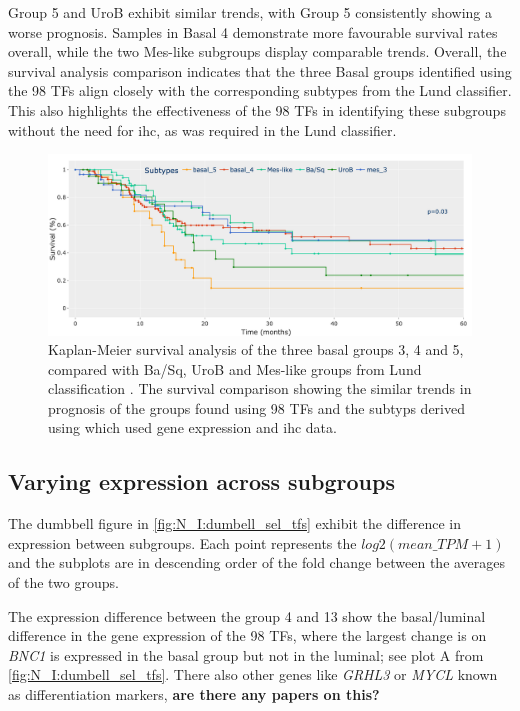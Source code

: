 Group 5 and UroB exhibit similar trends, with Group 5 consistently showing a worse prognosis. Samples in Basal 4 demonstrate more favourable survival rates overall, while the two Mes-like subgroups display comparable trends. Overall, the survival analysis comparison indicates that the three Basal groups identified using the 98 TFs align closely with the corresponding subtypes from the Lund classifier. This also highlights the effectiveness of the 98 TFs in identifying these subgroups without the need for \acrlong{ihc}, as was required in the Lund classifier.


\begin{figure}[!htb]
    \centering
    \includegraphics[width=1.0\textwidth,keepaspectratio]{Sections/Network_I/Resources/selective_pruning/comp_leiden_survival.png}
    \caption{Kaplan-Meier survival analysis of the three basal groups 3, 4 and 5, compared with Ba/Sq, UroB and Mes-like groups from Lund classification \citep{Marzouka2018-ge}. The survival comparison showing the similar trends in prognosis of the groups found using 98 TFs and the subtyps derived using \citet{Marzouka2018-ge} which used gene expression and \acrlong{ihc} data. }
    \label{fig:N_I:sel_tfs_comp_leiden}
\end{figure} 




\subsection{Varying expression across subgroups} \label{s:N_I:sel_tfs_ge}

The dumbbell figure in \cref{fig:N_I:dumbell_sel_tfs} exhibit the difference in expression between subgroups. Each point represents the $log2(mean\_TPM+1)$ and the subplots are in descending order of the fold change between the averages of the two groups.

The expression difference between the group 4 and 13 show the basal/luminal difference in the gene expression of the 98 TFs, where the largest change is on \textit{BNC1} is expressed in the basal group but not in the luminal; see plot A from \cref{fig:N_I:dumbell_sel_tfs}. There also other genes like \textit{GRHL3} or \textit{MYCL} known as differentiation markers, \textbf{are there any papers on this?}

